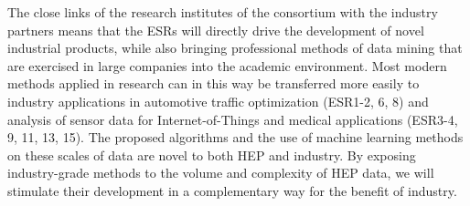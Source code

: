 The close links of the research institutes of the consortium with the
industry partners means that the ESRs will directly drive the development of
novel industrial products, while also bringing professional methods
of data mining that are exercised in large
companies into the academic environment. 
Most modern methods applied in research can
in this way be transferred more easily to industry applications in automotive
traffic optimization (ESR1-2, 6, 8) 
and analysis of sensor data for
Internet-of-Things and medical applications (ESR3-4, 9, 11, 13, 15).
The proposed algorithms and the use of machine learning methods on these
scales of data are novel to both HEP and industry. 
By exposing industry-grade methods to the volume and complexity of HEP data,
we will stimulate their development in a complementary way for the benefit of industry.

